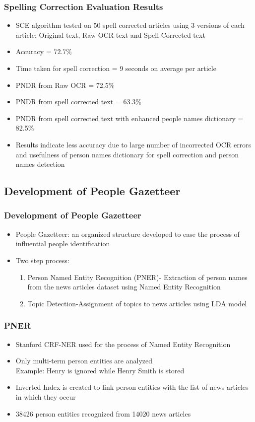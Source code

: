\documentclass{beamer}
\begin{document}
\begin{frame}
\frametitle{Spelling Correction Evaluation Results}
\begin{itemize}
\item
SCE algorithm tested on 50 spell corrected articles using 3 versions of each article: Original text, Raw OCR text and Spell Corrected text
\item
Accuracy = $72.7 \%$
\item
Time taken for spell correction = 9 seconds on average per article
\item
PNDR from Raw OCR = 72.5\%
\item
PNDR from spell corrected text = 63.3\%
\item
PNDR from spell corrected text with enhanced people names dictionary = 82.5\%
\item
Results indicate less accuracy due to large number of incorrected OCR errors and usefulness of person names dictionary for spell correction and person names detection 
\end{itemize}
\end{frame}


\subsection{Development of People Gazetteer}
\begin{frame}
\frametitle{Development of People Gazetteer}
\begin{itemize}
\item
People Gazetteer: an organized structure developed to ease the process of influential people identification
\item
Two step process:
\begin{enumerate}
\item
Person Named Entity Recognition (PNER)-
 Extraction of person names from the news articles dataset using Named Entity Recognition
\item
Topic Detection-Assignment of topics to news articles using LDA model
\end{enumerate}
\end{itemize}
\end{frame}



\begin{frame}
\frametitle{PNER}
\begin{itemize}
\item
 Stanford CRF-NER used for the process of Named Entity Recognition 
\item
Only multi-term person entities are analyzed \\
Example: \alert {Henry} is ignored while \alert{Henry Smith} is stored
\item
Inverted Index is created to link person entities with the list of news articles in which they occur
\item
38426 person entities recognized from 14020 news articles 

\end{itemize}
\end{frame}
\end{document}
